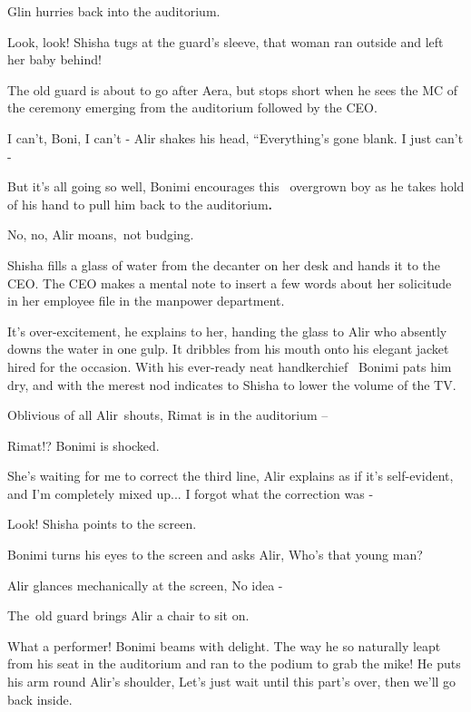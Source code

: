 \documentclass[letterpaper]{article}
\begin{document}
Glin hurries back into the auditorium. 

{\textquotedbl}Look, look!{\textquotedbl} Shisha tugs at the guard's sleeve,{\textquotedbl} that woman ran outside and
left her baby behind!{\textquotedbl} 

The old guard is about to go after Aera, but stops short when he sees the MC of the ceremony emerging from the
auditorium followed by the CEO.

{\textquotedbl}I can't, Boni, I can't -{\textquotedbl} Alir shakes his head, ``Everything's gone blank. I just can't
-{\textquotedbl}~ 

{\textquotedbl}But it's all going so well,{\textquotedbl} Bonimi encourages this \textcolor{red}{\ }overgrown boy as he
takes hold of his hand to pull him back to the auditorium\textbf{. }

{\textquotedbl}No, no,{\textquotedbl} Alir moans,~not budging.

Shisha fills a glass of water from the decanter on her desk and hands it to the CEO. The CEO makes a mental note to
insert a few words about her solicitude in her employee file in the manpower department. 

{\textquotedbl}It's over-excitement,{\textquotedbl} he explains to her, handing the glass to Alir who absently downs the
water in one gulp. It dribbles from his mouth onto his elegant jacket hired for the occasion. With his ever-ready neat
handkerchief \ Bonimi pats him dry, and with the merest nod indicates to Shisha to lower the volume of the TV.

Oblivious of all Alir~shouts, {\textquotedbl}Rimat is in the auditorium --{\textquotedbl} 

{\textquotedbl}Rimat!?{\textquotedbl} Bonimi is shocked. 

{\textquotedbl}She's waiting for me to correct the third line,{\textquotedbl} Alir explains as if it's self-evident,
{\textquotedbl}and I'm completely mixed up... I forgot what the correction was -{\textquotedbl}

{\textquotedbl}Look!{\textquotedbl} Shisha points to the screen.

Bonimi turns his eyes to the screen and asks Alir, {\textquotedbl}Who's that young man?{\textquotedbl} 

Alir glances mechanically at the screen, {\textquotedbl}No idea -{\textquotedbl}

The~old guard brings Alir a chair to sit on.

{\textquotedbl}What a performer!{\textquotedbl} Bonimi beams with delight. {\textquotedbl}The way he so naturally leapt
from his seat in the auditorium and ran to the podium to grab the mike!{\textquotedbl} He puts his arm round Alir's
shoulder, {\textquotedbl}Let's just wait until this part's over, then we'll go back inside.{\textquotedbl} 
\end{document}
